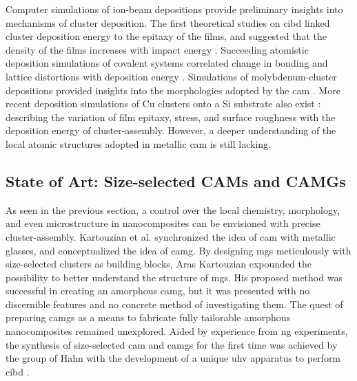 Computer simulations of ion-beam depositions provide preliminary insights into mechanisms of cluster deposition. The first theoretical studies on \gls{cibd} linked cluster deposition energy to the epitaxy of the films, and suggested that the density of the films increases with impact energy \cite{Muller1987,Cleveland1992}. Succeeding atomistic deposition simulations of covalent systems correlated change in bonding and lattice distortions with deposition energy \cite{Albe1998}. Simulations of molybdenum-cluster depositions provided insights into the morphologies adopted by the \gls{cam} \cite{Haberland1993,Haberland1995}. More recent deposition simulations of Cu clusters onto a Si substrate also exist \cite{Hwang2012,Gong2012}: describing the variation of film epitaxy, stress, and surface roughness with the deposition energy of cluster-assembly. However, a deeper understanding of the local atomic structures adopted in metallic \gls{cam} is still lacking. \par


\subsection{State of Art: Size-selected CAMs and CAMGs} \label{s:camg-uhv}
As seen in the previous section, a control over the local chemistry, morphology, and even microstructure in nanocomposites can be envisioned with precise cluster-assembly. Kartouzian et al. \cite{Kartouzian2013,Kartouzian2014} synchronized the idea of \gls{cam} with metallic glasses, and conceptualized the idea of \acrfull{camg}. By designing \gls{mg}s meticulously with size-selected clusters as building blocks, Aras Kartouzian expounded the possibility to better understand the structure of \gls{mg}s. His proposed method was successful in creating an amorphous \gls{camg}, but it was presented with no discernible features and no concrete method of investigating them. The quest of preparing \gls{camg}s as a means to fabricate fully tailorable amorphous nanocomposites remained unexplored. Aided by experience from \gls{ng} experiments, the synthesis of size-selected \gls{cam} and \gls{camg}s for the first time was achieved by the group of Hahn with the development of a unique \gls{uhv} apparatus to perform \gls{cibd} \cite{Fischer2015,Fischer2015a,Benel2018}. 

